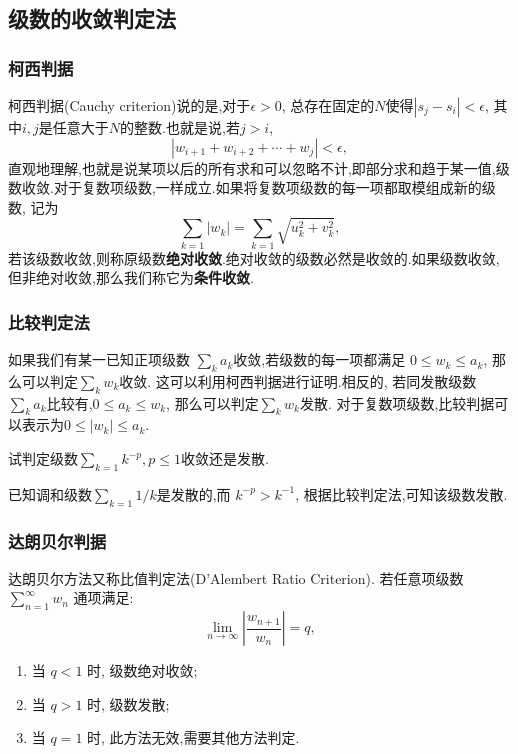 \subsection{级数的收敛判定法}

\subsubsection{柯西判据}
柯西判据(Cauchy criterion)说的是,对于$\epsilon>0$, 总存在固定的$N$使得$|s_j - s_i|< \epsilon$, 其中$i,j$是任意大于$N$的整数.也就是说,若$j>i$,
\begin{equation}
    | w_{i+1} + w_{i+2} + \cdots + w_{j} | < \epsilon ,
\end{equation}
直观地理解,也就是说某项以后的所有求和可以忽略不计,即部分求和趋于某一值,级数收敛.对于复数项级数,一样成立.如果将复数项级数的每一项都取模组成新的级数,
记为
\begin{equation}
    \sum_{k=1} |w_k| = \sum_{k=1}\sqrt { u_k^2 + v_k^2},
\end{equation}
若该级数收敛,则称原级数\textbf{绝对收敛}.绝对收敛的级数必然是收敛的.如果级数收敛,但非绝对收敛,那么我们称它为\textbf{条件收敛}.

\subsubsection{比较判定法}
如果我们有某一已知正项级数 $\sum_k a_k$收敛,若级数的每一项都满足 $0 \leq w_k \leq a_k$, 那么可以判定$\sum_k w_k$收敛.
这可以利用柯西判据进行证明.相反的, 若同发散级数$\sum_{k} a_k$比较有,$0 \leq a_k  \leq w_k$, 那么可以判定$\sum_k w_k$发散.
对于复数项级数,比较判据可以表示为$0 \leq |w_k| \leq a_k$.

\begin{example}
试判定级数$\sum_{k=1} k^{-p}, p\leq 1$收敛还是发散.
\end{example}
\begin{solution}
    已知调和级数$\sum_{k=1}1/k$是发散的,而 $k^{-p} > k^{-1}$, 根据比较判定法,可知该级数发散.
\end{solution}

\subsubsection{达朗贝尔判据}
达朗贝尔方法又称比值判定法(D'Alembert Ratio Criterion).
若任意项级数 $\sum_{n=1}^{\infty} w_n$ 通项满足:
$$
\lim _{n \to \infty}\left|\frac{w_{n+1}}{w_n}\right|=q ,
$$
\begin{enumerate}
    \item 当 $q<1$ 时, 级数绝对收敛;
    \item 当 $q>1$ 时, 级数发散;
    \item 当 $q=1$ 时, 此方法无效,需要其他方法判定.
\end{enumerate}

